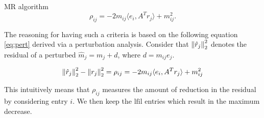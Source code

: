 \documentclass[paper=A4, fontsize=11pt]{scrartcl}
\let\originalleft\left
\let\originalright\right
\renewcommand{\left}{\mathopen{}\mathclose\bgroup\originalleft}
\renewcommand{\right}{\aftergroup\egroup\originalright}
\theoremstyle{remark}
\begin{document}
\begin{section}{MR algorithm}
	\begin{equation}\label{eq:rho}
	\rho_{i j}=-2 m_{i j}\langle e_{i}, A^{T} r_{j}\rangle+m_{i j}^{2}.
	\end{equation}


The reasoning for having such a criteria is based on the following equation \eqref{eq:pert} derived via a perturbation analysis.
Consider that $\left\|\hat{r}_{j}\right\|_{2}^{2}$ denotes the residual of a perturbed $\hat{m}_{j} = m_j + d$, where $d = m_{ij} e_j$.

\begin{equation}\label{eq:pert}
\left\|\hat{r}_{j}\right\|_{2}^{2}-\left\|r_{j}\right\|_{2}^{2}= \rho_{i j} = -2 m_{i j}\langle e_{i}, A^{T} r_{j}\rangle +m_{i j}^{2}
\end{equation}

This intuitively means that $\rho_{i j}$ measures the amount of reduction in the residual by considering entry $i$. We then keep the $\text{lfil}$ entries which result in the maximum decrease.
	
	
\end{section}


\newpage
\end{document}
